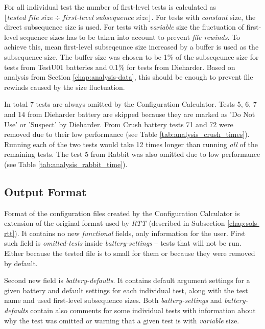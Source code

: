\documentclass[
  digital,     %
  oneside,     %
  nosansbold,  %
  nocolorbold, %
  nolof,         %
  nolot,         %
]{fithesis4}
\begin{document}
For all individual test the number of first-level tests is calculated as $\lfloor tested\:file\:size \div first$-$level\:subsequence\:size\rfloor$. For tests with \emph{constant} size, the direct subsequence size is used. For tests with \emph{variable} size the fluctuation of first-level sequence sizes has to be taken into account to prevent \emph{file rewinds}. To achieve this, mean first-level subseqeunce size increased by a buffer is used as the subsequence size. The buffer size was chosen to be 1\% of the subseqeunce size for tests from TestU01 batteries and 0.1\% for tests from Dieharder. Based on analysis from Section \ref{chap:analysis-data}, this should be enough to prevent file rewinds caused by the size fluctuation.

In total 7 tests are always omitted by the Configuration Calculator. Tests 5, 6, 7 and 14 from Dieharder battery are skipped because they are marked as 'Do Not Use' or 'Suspect' by Dieharder. From Crush battery tests 71 and 72 were removed due to their low performance (see Table \ref{tab:analysis_crush_times}). Running each of the two tests would take 12 times longer than running \emph{all} of the remaining tests. The test 5 from Rabbit was also omitted due to low performance (see Table \ref{tab:analysis_rabbit_time}).


\subsection{Output Format}
Format of the configuration files created by the Configuration Calculator is extension of the original format used by \emph{RTT} (described in Subsection \ref{chap:sols-rtt}). It contains no new \emph{functional} fields, only information for the user. First such field is \emph{omitted-tests} inside \emph{battery-settings} -- tests that will not be run. Either because the tested file is to small for them or because they were removed by default.

Second new field is \emph{battery-defaults}. It contains default argument settings for a given battery and default settings for each individual test, along with the test name and used first-level subsequence sizes. Both \emph{battery-settings} and \emph{battery-defaults} contain also comments for some individual tests with information about why the test was omitted or warning that a given test is with \emph{variable} size.
\end{document}
